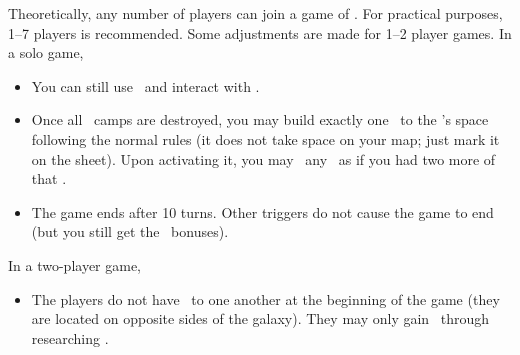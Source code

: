 Theoretically, any number of players can join a game of \asciiplanets.  For practical purposes, 1–7 players is recommended.  Some adjustments are made for 1–2 player games.
\newline\newline
In a solo game,
\begin{itemize}
  \item You can still use \convoys\ and interact with \pirates.
  \item Once all \pirates\ camps are destroyed, you may build exactly one \battleship\ to the \pirate's space following the normal rules (it does not take space on your map; just mark it on the sheet).  Upon activating it, you may \activate\ any \armament\ as if you had two more of that \armament.
  \item The game ends after 10 turns. Other triggers do not cause the game to end (but you still get the \mastery\ bonuses).
\end{itemize}
In a two-player game,
\begin{itemize}
  \item The players do not have \reach\ to one
another at the beginning of the game (they are located on opposite sides of the galaxy). They may only gain \reach\ through researching \warpdrive.
\end{itemize}
